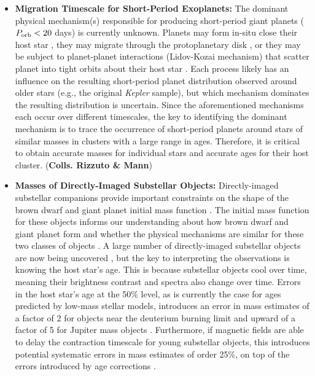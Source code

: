 \begin{itemize}
	\item {\bf Migration Timescale for Short-Period Exoplanets:} The dominant physical mechanism(s) responsible for producing short-period giant planets ($P_{\rm orb} < 20$ days) is currently unknown. Planets may form in-situ close their host star \citep{}, they may migrate through the protoplanetary disk \citep{}, or they may be subject to planet-planet interactions (Lidov-Kozai mechanism) that scatter planet into tight orbits about their host star \citep{}. Each process likely has an influence on the resulting short-period planet distribution observed around older stars (e.g., the original \emph{Kepler} sample), but which mechanism dominates the resulting distribution is uncertain. Since the aforementioned mechanisms each occur over different timescales, the key to identifying the dominant mechanism is to trace the occurrence of short-period planets around stars of similar masses in clusters with a large range in ages. Therefore, it is critical to obtain accurate masses for individual stars and accurate ages for their host cluster. ({\bf Colls. Rizzuto \& Mann})\\
	
	\item {\bf Masses of Directly-Imaged Substellar Objects:} Directly-imaged substellar companions provide important constraints on the shape of the brown dwarf and giant planet initial mass function \citep[e.g.,][]{Chabrier2003}. The initial mass function for these objects informs our understanding about how brown dwarf and giant planet form and whether the physical mechanisms are similar for these two classes of objects \citep{Chabrier2014}. A large number of directly-imaged substellar objects are now being uncovered \citep[e.g.,][]{Chauvin2004, Kalas2008, Spiegel2011, Bower2013, Hinkley2015, Macintosh2015}, but the key to interpreting the observations is knowing the host star's age. This is because substellar objects cool over time, meaning their brightness contrast and spectra also change over time. Errors in the host star's age at the 50\% level, as is currently the case for ages predicted by low-mass stellar models, introduces an error in mass estimates of a factor of 2 for objects near the deuterium burning limit \citep{Chabrier2000} and upward of a factor of 5 for Jupiter mass objects \citep{Baraffe2003}. Furthermore, if magnetic fields are able to delay the contraction timescale for young substellar objects, this introduces potential systematic errors in mass estimates of order 25\%, on top of the errors introduced by age corrections \citep{Chabrier2000}.  \\
	

\end{itemize}
